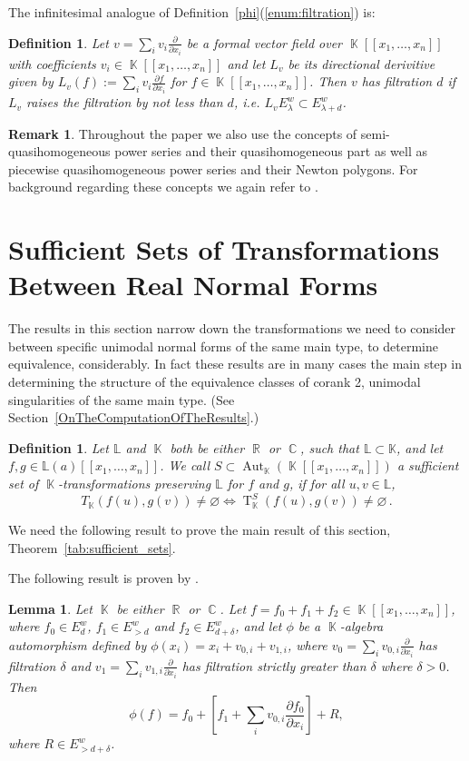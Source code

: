 \documentclass[noend]{amsproc}
\newtheorem{defn}[theorem]{Definition}
\newtheorem{lemma}[theorem]{Lemma}
\theoremstyle{definition}
\newtheorem{remark}[theorem]{Remark}
\DeclareMathOperator{\R}{\mathbb{R}}
\DeclareMathOperator{\C}{\mathbb{C}}
\DeclareMathOperator{\K}{\mathbb{K}}
\DeclareMathOperator{\T}{T}
\DeclareMathOperator{\Aut}{Aut}
\begin{document}
The infinitesimal analogue of Definition~\ref{phi}(\ref{enum:filtration}) is:

\begin{defn}
Let $v = \sum_i v_i \frac{\partial}{\partial x_i}$ be a formal vector field
over $\K[[x_1,\ldots,x_n]]$ with coefficients $v_i \in \K[[x_1,\ldots,x_n]]$
and let $L_v$ be its directional derivitive given by
$L_v(f) := \sum_i v_i \frac{\partial f}{\partial x_i}$ for
$f \in \K[[x_1,\ldots,x_n]]$. Then $v$ has filtration $d$ if $L_v$ raises the
filtration by not less than $d$, i.e.\@
$L_v E^w_\lambda \subset E^w_{\lambda+d}$.
\end{defn}

\begin{remark}
Throughout the paper we also use the concepts of semi-quasi\-homogeneous power
series and their quasihomogeneous part as well as piecewise quasihomogeneous
power series and their Newton polygons. For background regarding these concepts
we again refer to \citet{A1974}.
\end{remark}


\section{Sufficient Sets of Transformations Between Real Normal Forms}

The results in this section narrow down the transformations we need to consider
between specific unimodal normal forms of the same main type, to determine
equivalence, considerably. In fact these results are in many cases the main
step in determining the structure of the equivalence classes of corank 2,
unimodal singularities of the same main type. (See
Section~\ref{OnTheComputationOfTheResults}.)

\begin{defn}
Let $\mathbb L$ and $\K$ both be either $\R$ or $\C$, such that
$\mathbb L\subset\mathbb K$, and let $f,g\in\mathbb L(a)[[x_1,\ldots,x_n]]$. We
call $S\subset \Aut_{\K}(\K[[x_1,\ldots,x_n]])$ a sufficient set of
$\K$-transformations preserving $\mathbb L$ for $f$ and $g$, if for all
$u,v\in\mathbb L$,
\[
T_{\K}(f(u),g(v))\neq\varnothing\Leftrightarrow
\T_{\K}^S(f(u),g(v))\neq\varnothing\,.
\]
\end{defn}
We need the following result to prove the main result of this section,
Theorem~\ref{tab:sufficient_sets}.

The following result is proven by \citet{A1974}.
\begin{lemma}\label{vectorlemma}
Let $\K$ be either $\R$ or $\C$. Let $f=f_0+f_1+f_2\in\K[[x_1,\ldots,x_n]]$,
where $f_0\in E^w_d$, $f_1\in E^w_{>d}$ and $f_2\in E^w_{d+\delta}$, and let
$\phi$ be a $\K$-algebra automorphism defined by
$\phi(x_i)=x_i+v_{0,i}+v_{1,i}$, where
$v_0=\sum_iv_{0,i}\frac{\partial}{\partial x_i}$ has filtration $\delta$ and
$v_1=\sum_iv_{1,i}\frac{\partial}{\partial x_i}$ has filtration strictly
greater than $\delta$ where $\delta>0$. Then
\[
\phi(f)=f_0+\left[ f_1+\sum_iv_{0,i}\frac{\partial f_0}{\partial x_i}\right]+R,
\]
where $R\in E^w_{>d+\delta}$.
\end{lemma}
\end{document}

